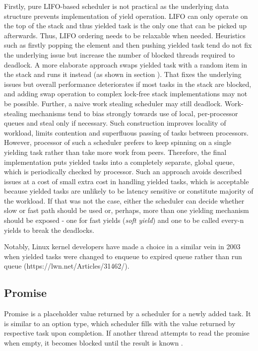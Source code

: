 \documentclass[12pt,a4paper,twoside]{report}
\begin{document}
Firstly, pure LIFO-based scheduler is not practical as the underlying data structure prevents implementation of yield operation. LIFO can only operate on the top of the stack and thus yielded task is the only one that can be picked up afterwards. Thus, LIFO ordering needs to be relaxable when needed. Heuristics such as firstly popping the element and then pushing yielded task tend do not fix the underlying issue but increase the number of blocked threads required to deadlock. A more elaborate approach swaps yielded task with a random item in the stack and runs it instead (as shown in section ). That fixes the underlying issues but overall performance deteriorates if most tasks in the stack are blocked, and adding swap operation to complex lock-free stack implementations may not be possible. Further, a naive work stealing scheduler may still deadlock. Work-stealing mechanisms tend to bias strongly towards use of local, per-processor queues and steal only if necessary. Such construction improves locality of workload, limits contention and superfluous passing of tasks between processors. However, processor of such a scheduler prefers to keep spinning on a single yielding task rather than take more work from peers. Therefore, the final implementation puts yielded tasks into a completely separate, global queue, which is periodically checked by processor. Such an approach avoids described issues at a cost of small extra cost in handling yielded tasks, which is acceptable because yielded tasks are unlikely to be latency sensitive or constitute majority of the workload. If that was not the case, either the scheduler can decide whether slow or fast path should be used or, perhaps, more than one yielding mechanism should be exposed - one for fast yields (\textit{soft yield}) and one to be called every-n yields to break the deadlocks. 

Notably, Linux kernel developers have made a choice in a similar vein in 2003 when yielded tasks were changed to enqueue to expired queue rather than run queue  (https://lwn.net/Articles/31462/). 


\subsection{Promise}
\label{section:promise}
Promise is a placeholder value returned by a scheduler for a newly added task. It is similar to an option type, which scheduler fills with the value returned by respective task upon completion. If another thread attempts to read the promise when empty, it becomes blocked until the result is known \cite{Swalens2014}. 
\end{document}
